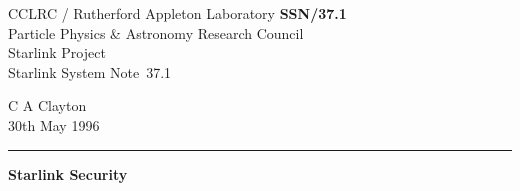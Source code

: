 \documentclass[11pt]{article}
\newcommand{\stardoccategory}  {Starlink System Note}
\newcommand{\stardocinitials}  {SSN}
\newcommand{\stardocnumber}    {37.1}
\newcommand{\stardocauthors}   {C A Clayton}
\newcommand{\stardocdate}      {30th May 1996}
\newcommand{\stardoctitle}     {Starlink Security}
\newcommand{\stardocname}{\stardocinitials /\stardocnumber}
\newenvironment{latexonly}{}{}
\begin{document}
\thispagestyle{empty}

\begin{latexonly}
   CCLRC / {\sc Rutherford Appleton Laboratory} \hfill {\bf \stardocname}\\
   {\large Particle Physics \& Astronomy Research Council}\\
   {\large Starlink Project\\}
   {\large \stardoccategory\ \stardocnumber}
   \begin{flushright}
   \stardocauthors\\
   \stardocdate
   \end{flushright}
   \vspace{-4mm}
   \rule{\textwidth}{0.5mm}
   \vspace{5mm}
   \begin{center}
   {\Large\bf \stardoctitle}
   \end{center}
   \vspace{5mm}

\end{latexonly}
\end{document}
